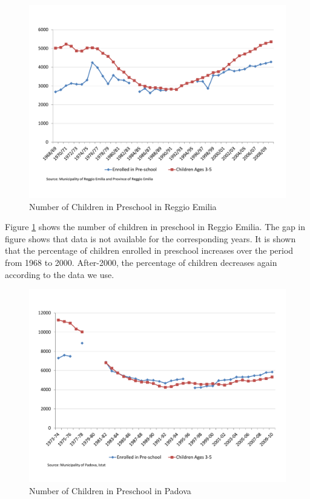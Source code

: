 

\begin{figure}[H] \caption{Number of Children in Preschool in Reggio Emilia} \label{fig:num-children-RE}
	\centering
	\includegraphics[scale=0.65]{../../output/image/Enrollement_Preschool_RE.pdf}
\end{figure}

Figure \ref{fig:num-children-RE} shows the number of children in preschool in Reggio Emilia. The gap in figure shows that data is not available for the corresponding years. It is shown that the percentage of children enrolled in preschool increases over the period from 1968 to 2000. After-2000, the percentage of children decreases again according to the data we use. 
\begin{figure}[H] \caption{Number of Children in Preschool in Padova} \label{fig:num_children_Pv}
	\centering
	\includegraphics[scale=0.65]{../../output/image/Enrollement_Preschool_Padova.pdf}
\end{figure}

